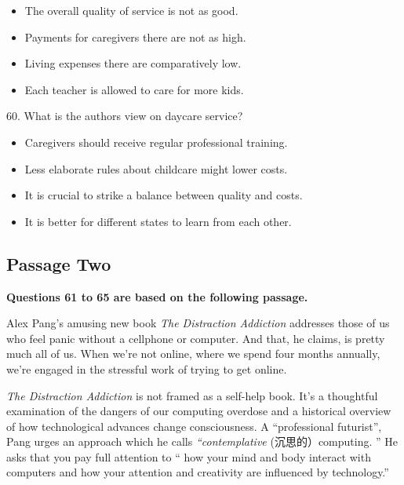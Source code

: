 \documentclass[UTF8,11pt]{ctexart}
\begin{document}
\begin{itemize}[leftmargin=2em,itemsep=.2em,topsep=.4em]\item[A.] The overall quality of service is not as good.
\item[B.] Payments for caregivers there are not as high.
\item[C.] Living expenses there are comparatively low.
\item[D.] Each teacher is allowed to care for more kids.
\end{itemize}

60. What is the authors view on daycare service?


\begin{itemize}[leftmargin=2em,itemsep=.2em,topsep=.4em]\item[A.] Caregivers should receive regular professional training.
\item[B.] Less elaborate rules about childcare might lower costs.
\end{itemize}

\begin{itemize}[leftmargin=2em,itemsep=.2em,topsep=.4em]\item[C.] It is crucial to strike a balance between quality and costs.
\item[D.] It is better for different states to learn from each other.
\end{itemize}

\subsection*{\textbf{Passage Two}}


\textbf{Questions 61 to 65 are based on the following passage.}


Alex Pang’s amusing new book\textit{ The Distraction Addiction} addresses those of us who feel panic without a cellphone or computer. And that, he claims, is pretty much all of us. When we’re not online, where we spend four months annually, we’re engaged in the stressful work of trying to get online.


\textit{The Distraction Addiction} is not framed as a self-help book. It’s a thoughtful examination of the dangers of our computing overdose and a historical overview of how technological advances change consciousness. A “professional futurist”, Pang urges an approach which he calls\textit{ “contemplative} (沉思的）computing. ” He asks that you pay full attention to “ how your mind and body interact with computers and how your attention and creativity are influenced by technology.”
\end{document}
